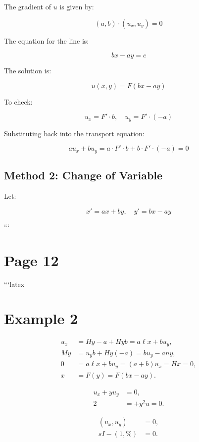 \documentclass[11pt]{article}
\begin{document}
The gradient of \(u\) is given by:

\[
(a, b) \cdot (u_x, u_y) = 0
\]

The equation for the line is:

\begin{equation}
    bx - ay = c
\end{equation}

The solution is:

\[
u(x, y) = F(bx - ay)
\]

To check:

\[
u_x = F' \cdot b, \quad u_y = F' \cdot (-a)
\]

Substituting back into the transport equation:

\[
a u_x + b u_y = a \cdot F' \cdot b + b \cdot F' \cdot (-a) = 0
\]

\subsection*{Method 2: Change of Variable}

Let:

\[
x' = ax + by, \quad y' = bx - ay
\]

```
\clearpage
\section*{Page 12}

```latex
\section*{Example 2}

\begin{align}
    u_x &= Hy - a + Hyb = a \ell x + b u_y, \\
    My &= u_y b + Hy(-a) = b u_y - a n y, \\
    0 &= a \ell x + b u_y = (a + b) u_x = Hx = 0, \\
    x &= F(y) = F(bx - ay).
\end{align}

\begin{align}
    u_x + y u_y &= 0, \\
    2 &= + y^2 u = 0.
\end{align}

\begin{align}
    (u_x, u_y) &= 0, \\
    s I - (1, \%) &= 0.
\end{align}
\end{document}
